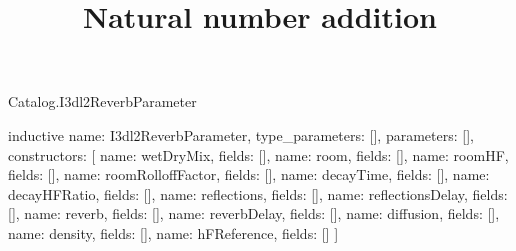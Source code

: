 \begin{lexlean}{Catalog.I3dl2ReverbParameter}
\title{Natural number addition}
\begin{semanticmodule}
inductive{
  name: I3dl2ReverbParameter,
  type_parameters: [],
  parameters: [],
  constructors: [
    {name: wetDryMix, fields: []},
    {name: room, fields: []},
    {name: roomHF, fields: []},
    {name: roomRolloffFactor, fields: []},
    {name: decayTime, fields: []},
    {name: decayHFRatio, fields: []},
    {name: reflections, fields: []},
    {name: reflectionsDelay, fields: []},
    {name: reverb, fields: []},
    {name: reverbDelay, fields: []},
    {name: diffusion, fields: []},
    {name: density, fields: []},
    {name: hFReference, fields: []}
  ]
}
\end{semanticmodule}
\end{lexlean}
